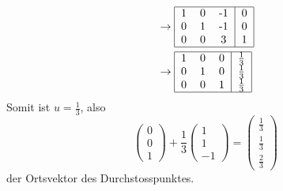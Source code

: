 \begin{loesung}
\begin{align*}
&\rightarrow
\begin{tabular}{|ccc|c|}
\hline
1&0&-1&0\\
0&1&-1&0\\
0&0&3&1\\
\hline
\end{tabular}
\\
&\rightarrow
\begin{tabular}{|ccc|c|}
\hline
1&0&0&$\frac13$\\
0&1&0&$\frac13$\\
0&0&1&$\frac13$\\
\hline
\end{tabular}
\end{align*}
Somit ist $u=\frac13$, also
\[
\begin{pmatrix}0\\0\\1\end{pmatrix}+\frac13\begin{pmatrix}1\\1\\-1\end{pmatrix}
=
\begin{pmatrix}\frac13\\\frac13\\\frac23\end{pmatrix}
\]
der Ortsvektor des Durchstosspunktes.
\end{loesung}

